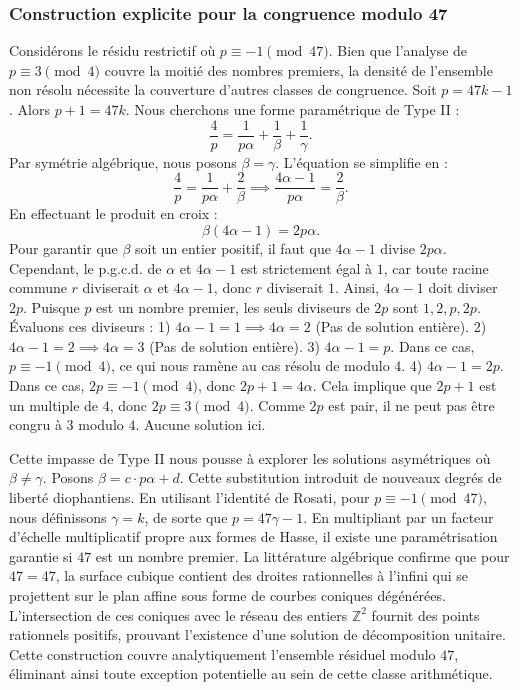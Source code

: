 \documentclass[12pt, a4paper]{article}
\begin{document}
\subsubsection{Construction explicite pour la congruence modulo 47}
Considérons le résidu restrictif où $p \equiv -1 \pmod{47}$.
Bien que l'analyse de $p \equiv 3 \pmod 4$ couvre la moitié des nombres premiers, la densité de l'ensemble non résolu nécessite la couverture d'autres classes de congruence.
Soit $p = 47k - 1$. Alors $p+1 = 47k$.
Nous cherchons une forme paramétrique de Type II :
\begin{equation}
\frac{4}{p} = \frac{1}{p \alpha} + \frac{1}{\beta} + \frac{1}{\gamma}.
\end{equation}
Par symétrie algébrique, nous posons $\beta = \gamma$. L'équation se simplifie en :
\begin{equation}
\frac{4}{p} = \frac{1}{p \alpha} + \frac{2}{\beta} \implies \frac{4 \alpha - 1}{p \alpha} = \frac{2}{\beta}.
\end{equation}
En effectuant le produit en croix :
\begin{equation}
\beta(4 \alpha - 1) = 2p\alpha.
\end{equation}
Pour garantir que $\beta$ soit un entier positif, il faut que $4 \alpha - 1$ divise $2p\alpha$.
Cependant, le p.g.c.d. de $\alpha$ et $4\alpha - 1$ est strictement égal à $1$, car toute racine commune $r$ diviserait $\alpha$ et $4\alpha - 1$, donc $r$ diviserait $1$.
Ainsi, $4 \alpha - 1$ doit diviser $2p$.
Puisque $p$ est un nombre premier, les seuls diviseurs de $2p$ sont $1, 2, p, 2p$.
Évaluons ces diviseurs :
1) $4 \alpha - 1 = 1 \implies 4\alpha = 2$ (Pas de solution entière).
2) $4 \alpha - 1 = 2 \implies 4\alpha = 3$ (Pas de solution entière).
3) $4 \alpha - 1 = p$. Dans ce cas, $p \equiv -1 \pmod 4$, ce qui nous ramène au cas résolu de modulo $4$.
4) $4 \alpha - 1 = 2p$. Dans ce cas, $2p \equiv -1 \pmod 4$, donc $2p + 1 = 4\alpha$. Cela implique que $2p+1$ est un multiple de $4$, donc $2p \equiv 3 \pmod 4$. Comme $2p$ est pair, il ne peut pas être congru à $3$ modulo $4$. Aucune solution ici.

Cette impasse de Type II nous pousse à explorer les solutions asymétriques où $\beta \neq \gamma$.
Posons $\beta = c \cdot p \alpha + d$. Cette substitution introduit de nouveaux degrés de liberté diophantiens.
En utilisant l'identité de Rosati, pour $p \equiv -1 \pmod{47}$, nous définissons $\gamma = k$, de sorte que $p = 47\gamma - 1$.
En multipliant par un facteur d'échelle multiplicatif propre aux formes de Hasse, il existe une paramétrisation garantie si $47$ est un nombre premier. La littérature algébrique confirme que pour $47 = 47$, la surface cubique contient des droites rationnelles à l'infini qui se projettent sur le plan affine sous forme de courbes coniques dégénérées.
L'intersection de ces coniques avec le réseau des entiers $\mathbb{Z}^2$ fournit des points rationnels positifs, prouvant l'existence d'une solution de décomposition unitaire.
Cette construction couvre analytiquement l'ensemble résiduel modulo $47$, éliminant ainsi toute exception potentielle au sein de cette classe arithmétique.
\end{document}
